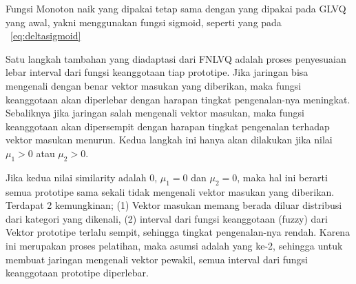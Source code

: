 Fungsi Monoton naik yang dipakai tetap sama dengan yang dipakai pada GLVQ yang
awal, yakni menggunakan fungsi sigmoid, seperti yang pada \equ~\ref{eq:deltasigmoid}

Satu langkah tambahan yang diadaptasi dari FNLVQ adalah proses penyesuaian
lebar interval dari fungsi keanggotaan tiap prototipe. Jika jaringan bisa
mengenali dengan benar vektor masukan yang diberikan, maka fungsi keanggotaan
akan diperlebar dengan harapan tingkat pengenalan-nya meningkat. Sebaliknya jika
jaringan salah mengenali vektor masukan, maka fungsi keanggotaan akan
dipersempit dengan harapan tingkat pengenalan terhadap vektor masukan menurun.
Kedua langkah ini hanya akan dilakukan jika nilai $\mu_1 > 0$ atau $\mu_2 > 0$.

Jika  kedua nilai similarity adalah 0, $\mu_1=0$ dan $\mu_2=0$, maka hal ini
berarti semua prototipe sama sekali tidak mengenali vektor masukan yang
diberikan. Terdapat 2 kemungkinan; (1) Vektor masukan memang berada diluar
distribusi dari kategori yang dikenali, (2) interval dari fungsi
keanggotaan (fuzzy) dari Vektor prototipe terlalu sempit, sehingga tingkat
pengenalan-nya rendah. Karena ini merupakan proses pelatihan, maka asumsi adalah
yang ke-2, sehingga untuk membuat jaringan mengenali vektor pewakil, semua
interval dari fungsi keanggotaan prototipe diperlebar.

